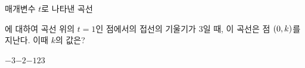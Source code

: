 매개변수 $t$로 나타낸 곡선 \par\smallskip{}\par\smallskip\noindent 에 대하여 곡선 위의 $t=1$인 점에서의 접선의 기울기가 $3$일 때, 이 곡선은 점 $(0{,}\mkern3mu\mathopen{}k)$를 지난다. 이때 $k$의 값은? 
\begin{choices32}{$-3$}{$-2$}{$-1$}{$2$}{$3$}\end{choices32}
